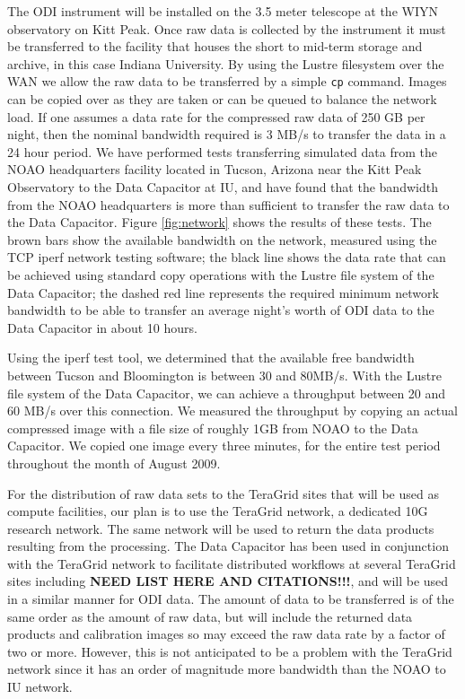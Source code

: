 \documentclass[10pt,conference]{IEEEtran}
\begin{document}
The ODI instrument will be installed on the 3.5 meter telescope at the WIYN observatory on Kitt Peak. Once raw data is collected by the instrument it must be transferred to the facility that houses the short to mid-term storage and archive, in this case Indiana University. By using the Lustre filesystem over the WAN we allow the raw data to be transferred by a simple {\tt cp} command. Images can be copied over as they are taken or can be queued to balance the network load. If one assumes a data rate for the compressed raw data of 250 GB per night, then the nominal bandwidth required is 3 MB/s to transfer the data in a 24 hour period. We have performed tests transferring simulated data from the NOAO headquarters facility located in Tucson, Arizona near the Kitt Peak Observatory to the Data Capacitor at IU, and have found that the bandwidth from the NOAO headquarters is more than sufficient to transfer the raw data to the Data Capacitor. Figure \ref{fig:network} shows the results of these tests. The brown bars show the available bandwidth on the network, measured using the TCP iperf network testing software; the black line shows the data rate that can be achieved using standard copy operations with the Lustre file system of the Data Capacitor; the dashed red line represents the required
minimum network bandwidth to be able to transfer an average night's worth of ODI data to
the Data Capacitor in about 10 hours.

Using the iperf test tool, we determined that the available free bandwidth between Tucson
and Bloomington is between 30 and 80MB/s. With the Lustre file system of the Data Capacitor,
we can achieve a throughput between 20 and 60 MB/s over this connection. We measured
the throughput by copying an actual compressed image with a file size of roughly 1GB from NOAO to
the Data Capacitor. We copied one image every three minutes, for the entire test period throughout the month of August 2009.

For the distribution of raw data sets to the TeraGrid sites that will be used as compute facilities, our plan is to use the TeraGrid network, a dedicated 10G research network. The same network will be used to return the data products resulting from the processing. The Data Capacitor has been used in conjunction with the TeraGrid network to facilitate distributed workflows at several TeraGrid sites including {\bf NEED LIST HERE AND CITATIONS!!!}, and will be used in a similar manner for ODI data. The amount of data to be transferred is of the same order as the amount of raw data, but will include the returned data products and calibration images so may exceed the raw data rate by a factor of two or more. However, this is not anticipated to be a problem with the TeraGrid network since it has an order of magnitude more bandwidth than the NOAO to IU network.
\end{document}
